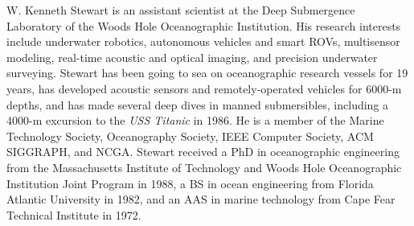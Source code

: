 \documentclass[dc]{svjour}
\begin{document}
\begin{biography}{W. Kenneth Stewart} is an assistant scientist at the
Deep Submergence Laboratory of the Woods Hole Oceanographic Institution.
His research interests include underwater robotics, autonomous vehicles
and smart ROVs, multisensor modeling, real-time acoustic and optical
imaging, and precision underwater surveying. Stewart has been going to
sea on oceanographic research vessels for 19 years, has developed
acoustic sensors and remotely-operated vehicles for 6000-m depths, and
has made several deep dives in manned submersibles, including a 4000-m
excursion to the {\it USS Titanic} in 1986. He is a member of the Marine
Technology Society, Oceanography Society, IEEE Computer Society, ACM
SIGGRAPH, and NCGA. Stewart received a PhD in oceanographic engineering
from the Massachusetts Institute of Technology and Woods Hole
Oceanographic Institution Joint Program in 1988, a BS in ocean
engineering from Florida Atlantic University in 1982, and an AAS in
marine technology from Cape Fear Technical Institute in 1972.
\end{biography}
\end{document}
